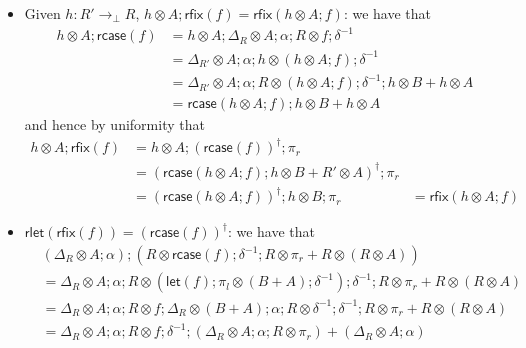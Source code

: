 \documentclass[acmsmall,screen,review]{acmart}
\newcommand{\ms}[1]{\ensuremath{\mathsf{#1}}}
\newcommand{\dmor}[1]{{\Delta}_{#1}}
\newcommand{\lmor}[1]{\ms{let}(#1)}
\newcommand{\rlmor}[1]{\ms{rlet}(#1)}
\newcommand{\rcase}[1]{\ms{rcase}(#1)}
\newcommand{\rfix}[1]{\ms{rfix}(#1)}
\begin{document}
\begin{itemize}
  \item Given $h : R' \to_\bot R$, $h \otimes A ; \rfix{f} = \rfix{h \otimes A ; f}$: we have that
  \begin{equation}
    \begin{aligned}
    h \otimes A ; \rcase{f} 
      & = h \otimes A ; \dmor{R} \otimes A ; \alpha ; R \otimes f ; \delta^{-1} \\
      & = \dmor{R'} \otimes A ; \alpha ; h \otimes (h \otimes A ; f) ; \delta^{-1} \\
      & = \dmor{R'} \otimes A ; \alpha ; R \otimes (h \otimes A ; f) ; \delta^{-1} 
        ; h \otimes B + h \otimes A \\
      & = \rcase{h \otimes A ; f} ; h \otimes B + h \otimes A
    \end{aligned}
  \end{equation}
  and hence by uniformity that
  \begin{equation}
    \begin{aligned}
    h \otimes A ; \rfix{f} 
      & = h \otimes A ; (\rcase{f})^\dagger ; \pi_r \\
      & = (\rcase{h \otimes A ; f} ; h \otimes B + R' \otimes A)^\dagger ; \pi_r \\
      & = (\rcase{h \otimes A ; f})^\dagger ; h \otimes B ; \pi_r 
      & = \rfix{h \otimes A ; f}
    \end{aligned}
  \end{equation}
  \item $\rlmor{\rfix{f}} = (\rcase{f})^\dagger$: we have that
  \begin{equation}
    \begin{aligned}
      & (\dmor{R} \otimes A ; \alpha)
        ; (R \otimes \rcase{f} 
        ; \delta^{-1} 
        ; R \otimes \pi_r + R \otimes (R \otimes A)) \\
      & = \dmor{R} \otimes A ; \alpha
        ; R \otimes (\lmor{f} ; \pi_l \otimes (B + A) ; \delta^{-1}) 
        ; \delta^{-1} 
        ; R \otimes \pi_r + R \otimes (R \otimes A) \\
      & = \dmor{R} \otimes A ; \alpha
        ; R \otimes f
        ; \dmor{R} \otimes (B + A) ; \alpha 
        ; R \otimes \delta^{-1} ; \delta^{-1}
        ; R \otimes \pi_r + R \otimes (R \otimes A) \\
      & = \dmor{R} \otimes A ; \alpha
        ; R \otimes f
        ; \delta^{-1}
        ; (\dmor{R} \otimes A ; \alpha ; R \otimes \pi_r) + (\dmor{R} \otimes A ; \alpha) \\

\end{aligned}
\end{equation}
\end{itemize}
\end{document}
